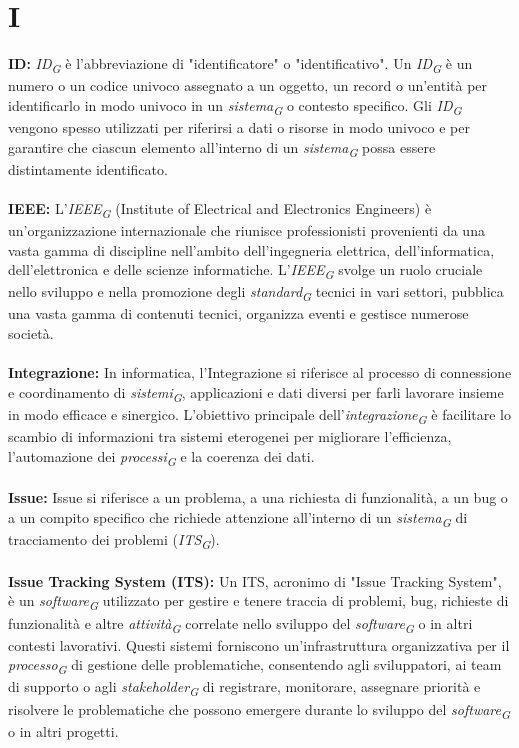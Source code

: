 \documentclass{article}
\begin{document}
\section*{I}
{}
\textbf{ID:} \textit{ID}\textsubscript{\textit{G}} è l'abbreviazione di "identificatore" o "identificativo". Un \textit{ID}\textsubscript{\textit{G}} è un numero o un codice univoco assegnato a un oggetto, un record o un'entità per identificarlo in modo univoco in un \textit{sistema}\textsubscript{\textit{G}} o contesto specifico. Gli \textit{ID}\textsubscript{\textit{G}} vengono spesso utilizzati per riferirsi a dati o risorse in modo univoco e per garantire che ciascun elemento all'interno di un \textit{sistema}\textsubscript{\textit{G}} possa essere distintamente identificato.
\\
\\
\textbf{IEEE:} L'\textit{IEEE}\textsubscript{\textit{G}} (Institute of Electrical and Electronics Engineers) è un'organizzazione internazionale che riunisce professionisti provenienti da una vasta gamma di discipline nell'ambito dell'ingegneria elettrica, dell'informatica, dell'elettronica e delle scienze informatiche. L'\textit{IEEE}\textsubscript{\textit{G}} svolge un ruolo cruciale nello sviluppo e nella promozione degli \textit{standard}\textsubscript{\textit{G}} tecnici in vari settori, pubblica una vasta gamma di contenuti tecnici, organizza eventi e gestisce numerose società.
\\
\\
\textbf{Integrazione:} In informatica, l'Integrazione si riferisce al processo di connessione e coordinamento di \textit{sistemi}\textsubscript{\textit{G}}, applicazioni e dati diversi per farli lavorare insieme in modo efficace e sinergico. L'obiettivo principale dell'\textit{integrazione}\textsubscript{\textit{G}} è facilitare lo scambio di informazioni tra sistemi eterogenei per migliorare l'efficienza, l'automazione dei \textit{processi}\textsubscript{\textit{G}} e la coerenza dei dati.
\\
\\
\textbf{Issue:} Issue si riferisce a un problema, a una richiesta di funzionalità, a un bug o a un compito specifico che richiede attenzione all'interno di un \textit{sistema}\textsubscript{\textit{G}} di tracciamento dei problemi (\textit{ITS}\textsubscript{\textit{G}}).
\\
\\
\textbf{Issue Tracking System (ITS):} Un ITS, acronimo di "Issue Tracking System", è un \textit{software}\textsubscript{\textit{G}} utilizzato per gestire e tenere traccia di problemi, bug, richieste di funzionalità e altre \textit{attività}\textsubscript{\textit{G}} correlate nello sviluppo del \textit{software}\textsubscript{\textit{G}} o in altri contesti lavorativi. Questi sistemi forniscono un'infrastruttura organizzativa per il \textit{processo}\textsubscript{\textit{G}} di gestione delle problematiche, consentendo agli sviluppatori, ai team di supporto o agli \textit{stakeholder}\textsubscript{\textit{G}} di registrare, monitorare, assegnare priorità e risolvere le problematiche che possono emergere durante lo sviluppo del \textit{software}\textsubscript{\textit{G}} o in altri progetti.
\pagebreak
\end{document}
